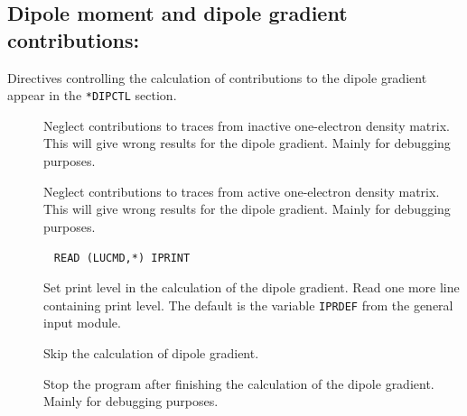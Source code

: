 \subsection{Dipole moment and dipole gradient contributions:
}\label{sec:dipctl}

Directives controlling the calculation of contributions to the
dipole gradient appear in the \verb|*DIPCTL| section.

\begin{description}
\item[] Neglect contributions to traces from
inactive one-electron density matrix. This will give wrong results for
the dipole gradient. Mainly for debugging purposes.

\item[] Neglect contributions to traces from
active one-electron density matrix. This will give wrong results for the
dipole gradient. Mainly for debugging purposes.

\item[]\verb| |\newline
\verb|READ (LUCMD,*) IPRINT|

Set print level in the calculation of the dipole gradient.  Read one more
line containing print level. The default
is the variable \verb|IPRDEF| from the general input module.

\item[] Skip the calculation of dipole gradient.


\item[] Stop the program after finishing the calculation
of the dipole gradient. Mainly for debugging purposes.
\end{description}

%

